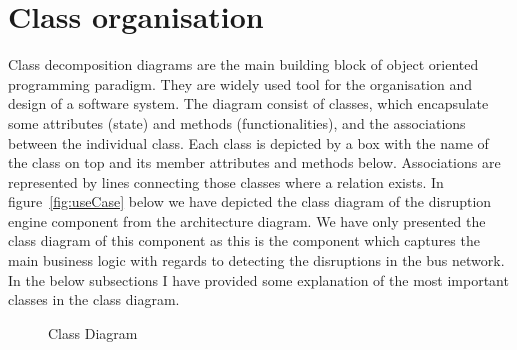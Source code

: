 \FloatBarrier
\section{Class organisation}
Class decomposition diagrams are the main building block of object oriented programming paradigm. They are widely used tool for the organisation and design of a software system. The diagram consist of classes, which encapsulate some attributes (state) and methods (functionalities), and the associations between the individual class. Each class is depicted by a box with the name of the class on top and its member attributes and methods below. Associations are represented by lines connecting those classes where a relation exists. In figure~\ref{fig:useCase} below we have depicted the class diagram of the disruption engine component from the architecture diagram. We have only presented the class diagram of this component as this is the component which captures the main business logic with regards to detecting the disruptions in the bus network. In the below subsections I have provided some explanation of the most important classes in the class diagram.

\begin{figure}
	\caption{Class Diagram}
\label{fig:class}
\end{figure}

